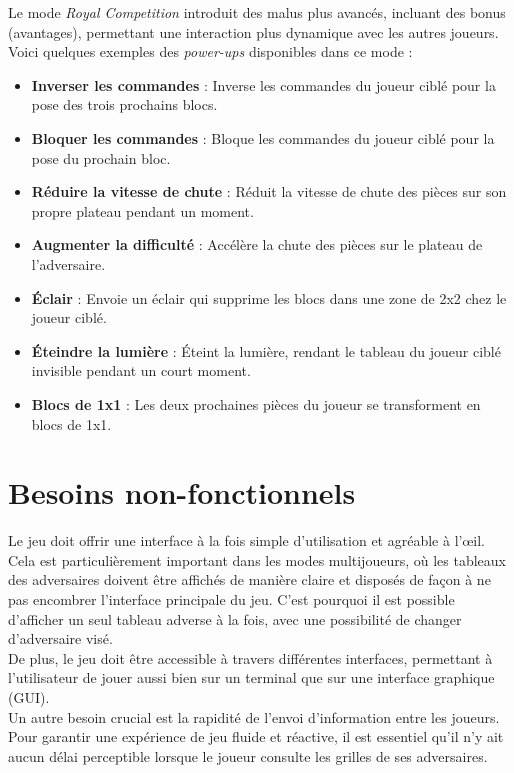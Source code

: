 \documentclass{report}
\begin{document}
\noindent Le mode \emph{Royal Competition} introduit des malus plus avancés, incluant des bonus (avantages), permettant une interaction plus dynamique avec les autres joueurs. Voici quelques exemples des \textit{power-ups} disponibles dans ce mode :
\begin{itemize}
    \item \textbf{Inverser les commandes} : Inverse les commandes du joueur ciblé pour la pose des trois prochains blocs.
    \item \textbf{Bloquer les commandes} : Bloque les commandes du joueur ciblé pour la pose du prochain bloc.
    \item \textbf{Réduire la vitesse de chute} : Réduit la vitesse de chute des pièces sur son propre plateau pendant un moment.
    \item \textbf{Augmenter la difficulté} : Accélère la chute des pièces sur le plateau de l’adversaire.
    \item \textbf{Éclair} : Envoie un éclair qui supprime les blocs dans une zone de 2x2 chez le joueur ciblé.
    \item \textbf{Éteindre la lumière} : Éteint la lumière, rendant le tableau du joueur ciblé invisible pendant un court moment.
    \item \textbf{Blocs de 1x1} : Les deux prochaines pièces du joueur se transforment en blocs de 1x1.
\end{itemize}





\section{Besoins non-fonctionnels}

\noindent Le jeu doit offrir une interface à la fois simple d’utilisation et agréable à l’œil. Cela est particulièrement important dans les modes multijoueurs, où les tableaux des adversaires doivent être affichés de manière claire et disposés de façon à ne pas encombrer l’interface principale du jeu. C'est pourquoi il est possible d'afficher un seul tableau adverse à la fois, avec une possibilité de changer d'adversaire visé.\\ 

\noindent De plus, le jeu doit être accessible à travers différentes interfaces, permettant à l’utilisateur de jouer aussi bien sur un terminal que sur une interface graphique (GUI). \\

\noindent Un autre besoin crucial est la rapidité de l’envoi d’information entre les joueurs. Pour garantir une expérience de jeu fluide et réactive, il est essentiel qu’il n’y ait aucun délai perceptible lorsque le joueur consulte les grilles de ses adversaires.
\end{document}
